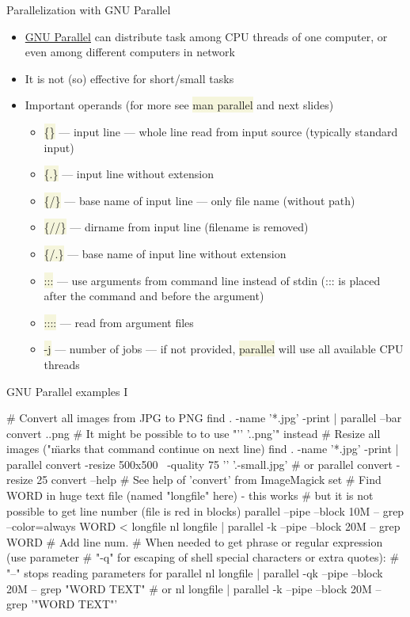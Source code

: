 \documentclass[compress, ucs, xelatex, 11pt, xcolor=svgnames, aspectratio=169,
	hyperref={
		bookmarks=true,
		unicode=true,
		colorlinks=true,
		pdftitle={Linux, command line and MetaCentrum},
		plainpages=false,
		pdfauthor={Vojtech Zeisek},
		pdfsubject={Course about use of Linux command line, writing shell scripts and using MetaCentrum of CESNET},
		pdfcreator={XeLaTeX},
		pdfkeywords={Linux, GNU, BASH, shell, command line, MetaCentrum},
		linkcolor=DarkRed, %
		anchorcolor=DarkBlue, %
		citecolor=Indigo, %
		filecolor=NavyBlue, %
		menucolor=DarkMagenta, %
		urlcolor=DarkBlue, %
		pdftex},
	url={hyphens, lowtilde} %
	]{beamer}
\renewcommand{\texttt}[1]{\colorbox{Beige}{{\ttfamily #1}}}
\begin{document}
\begin{frame}{Parallelization with GNU Parallel}
	\begin{itemize}
		\item \href{https://www.gnu.org/software/parallel/}{GNU Parallel} can distribute task among CPU threads of one computer, or even among different computers in network
		\item It is not (so) effective for short/small tasks
		\item Important operands (for more see \texttt{man parallel} and next slides)
		\begin{itemize}
			\item \texttt{\{\}} --- input line --- whole line read from input source (typically standard input)
			\item \texttt{\{.\}} --- input line without extension
			\item \texttt{\{/\}} --- base name of input line --- only file name (without path)
			\item \texttt{\{//\}} --- dirname from input line (filename is removed)
			\item \texttt{\{/.\}} --- base name of input line without extension
			\item \texttt{:::} --- use arguments from command line instead of stdin (::: is placed after the command and before the argument)
			\item \texttt{::::} --- read from argument files
			\item \texttt{-j} --- number of jobs --- if not provided, \texttt{parallel} will use all available CPU threads
		\end{itemize}
	\end{itemize}
\end{frame}

\begin{frame}[fragile]{GNU Parallel examples I} %
	\begin{bashcode}
    # Convert all images from JPG to PNG
    find . -name '*.jpg' -print | parallel --bar convert {} {.}.png
    # It might be possible to to use "'{}' '{.}.png'" instead
    # Resize all images ("\" marks that command continue on next line)
    find . -name '*.jpg' -print | parallel convert -resize 500x500 \
      -quality 75 '{}' '{.}-small.jpg' # or
    parallel convert -resize 25%
    convert --help # See help of 'convert' from ImageMagick set
    # Find WORD in huge text file (named "longfile" here) - this works
    # but it is not possible to get line number (file is red in blocks)
    parallel --pipe --block 10M -- grep --color=always WORD < longfile
    nl longfile | parallel -k --pipe --block 20M -- grep WORD # Add line num.
    # When needed to get phrase or regular expression (use parameter
    # "-q" for escaping of shell special characters or extra quotes):
    # "--" stops reading parameters for parallel
    nl longfile | parallel -qk --pipe --block 20M -- grep "WORD TEXT" # or
    nl longfile | parallel -k --pipe --block 20M -- grep '"WORD TEXT"'
	\end{bashcode}
\end{frame}
\end{document}
